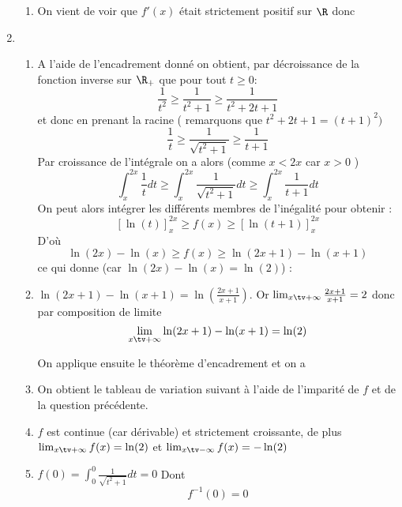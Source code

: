 \documentclass[a4paper, 11pt,reqno]{article}
\begin{document}
\begin{correction}
\begin{enumerate}
\begin{enumerate}
\item On vient de voir que $f'(x) $ était strictement positif sur $\R$ donc 
\end{enumerate}

\item 
\begin{enumerate}
\item A l'aide de l'encadrement donné on obtient, par décroissance de la fonction inverse sur $\R_+$ que pour tout $t\geq 0$:
$$\frac{1}{t^2}\geq \frac{1}{t^2+1}\geq \frac{1}{t^2+2t+1}$$
et donc en prenant la racine ( remarquons que $t^2+2t+1 = (t+1)^2)$
$$\frac{1}{t}\geq \frac{1}{\sqrt{t^2+1}}\geq \frac{1}{t+1}$$
Par croissance de l'intégrale on a alors (comme $x<2x$ car $x>0$ ) 
$$\int_x^{2x} \frac{1}{t}dt\geq \int_x^{2x}\frac{1}{\sqrt{t^2+1}}dt\geq\int_x^{2x} \frac{1}{t+1}dt$$
On peut alors intégrer les différents membres de l'inégalité pour obtenir : 
$$[\ln(t)]_x^{2x} \geq f(x) \geq [\ln(t+1)]_x^{2x}$$
D'où 
$$\ln(2x)-\ln(x) \geq f(x) \geq \ln(2x+1)-\ln(x+1)$$
ce qui donne  (car $\ln(2x)-\ln(x)=\ln(2)$) : 

\item $\ln(2x+1)-\ln(x+1) = \ln\left( \frac{2x+1}{x+1}\right)$. 
Or $\lim_{x\tv +\infty} \frac{2x+1}{x+1} =2 $ donc par composition de limite 
$$\lim_{x\tv +\infty } \ln(2x+1)-\ln(x+1) =\ln(2)$$

On applique ensuite le théorème d'encadrement et on a 


\item On obtient le tableau de variation suivant à l'aide de l'imparité de $f$ et de la question précédente. 
\begin{center}
\end{center}

\item $f$ est continue (car dérivable) et strictement croissante, de plus $\lim_{x\tv +\infty} f(x)= \ln(2)$ et  $\lim_{x\tv -\infty} f(x)= -\ln(2)$

\conclusion{Le théorème de la bijection assure que $f$ réalise une bijection de $\R$ sur $]-\ln(2) , \ln(2)[$}

\item $f(0) = \int_0^0 \frac{1}{\sqrt{t^2+1}}dt=0$ 
Dont $$f^{-1} (0) =0$$


\end{enumerate}
\end{enumerate}
\end{correction}
\end{document}
